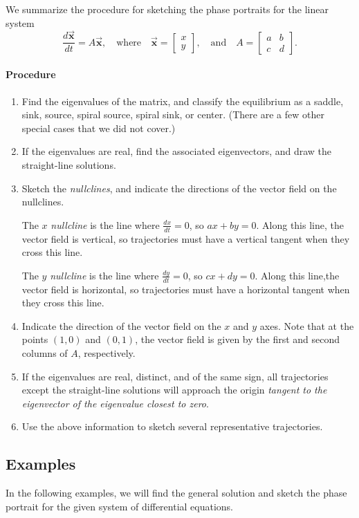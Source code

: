 \documentclass{book}
\newcommand{\BX}{\vec{\textbf{x}}}
\begin{document}
\noindent
We summarize the procedure for sketching the phase portraits for
the linear system
\[
    \frac{d\BX}{dt} = A\BX, \quad \textrm{where} \quad
    \BX=\begin{bmatrix} x \\ y \end{bmatrix},
    \quad \textrm{and} \quad
    A = \begin{bmatrix} a & b \\ c & d \end{bmatrix}.
\]
\paragraph{Procedure}
\begin{enumerate}
\item
Find the eigenvalues of the matrix, and classify the equilibrium as a
saddle, sink, source, spiral source, spiral sink, or center.
(There are a few other special cases that we did not cover.)
\item
If the eigenvalues are real, find the associated eigenvectors, and
draw the straight-line solutions.
\item  Sketch the \emph{nullclines}, and indicate the
directions of the vector field on the nullclines.

The $x$ \emph{nullcline} is the line where $\frac{dx}{dt}=0$,
so $ax+by=0$. Along this line, the vector field is vertical, so trajectories
must have a vertical tangent when they cross this line.

The $y$ \emph{nullcline} is the line where $\frac{dy}{dt}=0$, so
$cx+dy=0$.  Along this line,the vector field is horizontal, so
trajectories must have a horizontal tangent when they cross this line.
 
\item Indicate the direction of the vector field on the $x$ and $y$ axes.
Note that at the points $(1,0)$ and $(0,1)$, the
vector field is given by the first and second columns of $A$, respectively.
\item
If the eigenvalues are real, distinct, and of the same sign,
all trajectories except the straight-line solutions
will approach the origin \emph{tangent to the eigenvector
of the eigenvalue closest to zero}.
\item Use the above information to sketch several representative trajectories.
\end{enumerate}

\subsection*{Examples}
In the following examples, we will find the general solution and sketch
the phase portrait for the given system of differential equations.
\end{document}
